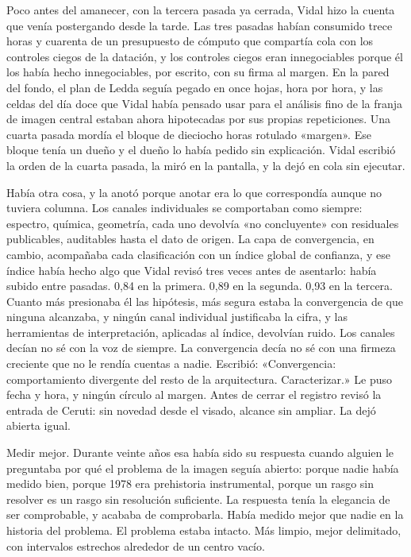 Poco antes del amanecer, con la tercera pasada ya cerrada, Vidal hizo la cuenta que venía postergando desde la tarde. Las tres pasadas habían consumido trece horas y cuarenta de un presupuesto de cómputo que compartía cola con los controles ciegos de la datación, y los controles ciegos eran innegociables porque él los había hecho innegociables, por escrito, con su firma al margen. En la pared del fondo, el plan de Ledda seguía pegado en once hojas, hora por hora, y las celdas del día doce que Vidal había pensado usar para el análisis fino de la franja de imagen central estaban ahora hipotecadas por sus propias repeticiones. Una cuarta pasada mordía el bloque de dieciocho horas rotulado «margen». Ese bloque tenía un dueño y el dueño lo había pedido sin explicación. Vidal escribió la orden de la cuarta pasada, la miró en la pantalla, y la dejó en cola sin ejecutar.

Había otra cosa, y la anotó porque anotar era lo que correspondía aunque no tuviera columna. Los canales individuales se comportaban como siempre: espectro, química, geometría, cada uno devolvía «no concluyente» con residuales publicables, auditables hasta el dato de origen. La capa de convergencia, en cambio, acompañaba cada clasificación con un índice global de confianza, y ese índice había hecho algo que Vidal revisó tres veces antes de asentarlo: había subido entre pasadas. 0,84 en la primera. 0,89 en la segunda. 0,93 en la tercera. Cuanto más presionaba él las hipótesis, más segura estaba la convergencia de que ninguna alcanzaba, y ningún canal individual justificaba la cifra, y las herramientas de interpretación, aplicadas al índice, devolvían ruido. Los canales decían no sé con la voz de siempre. La convergencia decía no sé con una firmeza creciente que no le rendía cuentas a nadie. Escribió: «Convergencia: comportamiento divergente del resto de la arquitectura. Caracterizar.» Le puso fecha y hora, y ningún círculo al margen. Antes de cerrar el registro revisó la entrada de Ceruti: sin novedad desde el visado, alcance sin ampliar. La dejó abierta igual.

Medir mejor. Durante veinte años esa había sido su respuesta cuando alguien le preguntaba por qué el problema de la imagen seguía abierto: porque nadie había medido bien, porque 1978 era prehistoria instrumental, porque un rasgo sin resolver es un rasgo sin resolución suficiente. La respuesta tenía la elegancia de ser comprobable, y acababa de comprobarla. Había medido mejor que nadie en la historia del problema. El problema estaba intacto. Más limpio, mejor delimitado, con intervalos estrechos alrededor de un centro vacío.

